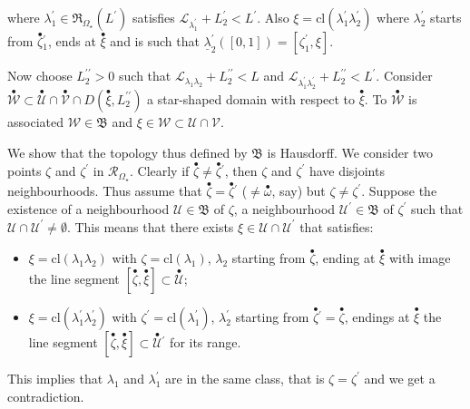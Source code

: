 \documentclass[11pt, english]{smfart}
\theoremstyle{definition}
\begin{document}
\begin{itemize}
\begin{itemize}
where $\lambda_1^\prime \in \mathfrak{R}_{\Omega_\star}(L^\prime) $ satisfies 
$\mathcal{L}_{\lambda_1^\prime} + L_2^\prime < L^\prime$.  Also $\xi =
\mathrm{cl}(\lambda_1^\prime \lambda_2^\prime)$ where
 $\lambda_2^\prime$ starts from ${ {\stackrel{\bullet}{\zeta}} }{_1^\prime}$, ends at ${ {\stackrel{\bullet}{\xi}} }$
and is such that  $\underline{\lambda}_2^\prime([0,1]) = [\zeta_1^\prime,\xi]$.
\end{itemize}
Now choose $L_2^{\prime \prime}>0$ such that $\displaystyle
 \mathcal{L}_{\lambda_1 \lambda_2} +L_2^{\prime \prime} <L$  and $\displaystyle
 \mathcal{L}_{\lambda_1^\prime \lambda_2^\prime} +L_2^{\prime \prime}
 <L^\prime$. Consider 
$\stackrel{\bullet}{\mathscr{W}} \subset \stackrel{\bullet}{\mathscr{U}}
 \cap \stackrel{\bullet}{\mathscr{V}} \cap D({ {\stackrel{\bullet}{\xi}} },L_2^{\prime
   \prime})$  a star-shaped domain with 
 respect to ${ {\stackrel{\bullet}{\xi}} }$. To $\stackrel{\bullet}{\mathscr{W}}$ is
 associated  $\mathscr{W} \in \mathfrak{B}$  and
$\xi \in \mathscr{W}  \subset \mathscr{U} \cap \mathscr{V}$.
\end{itemize}
We show that the topology thus defined by $\mathfrak{B}$ is
Hausdorff.  We consider two points
$\zeta $ and $\zeta^\prime$ in
$\mathscr{R}_{\Omega_\star}$. Clearly if ${ {\stackrel{\bullet}{\zeta}} } \neq { {\stackrel{\bullet}{\zeta}} }{^\prime}$,
then $\zeta$ and $\zeta^\prime$ have disjoints neighbourhoods. Thus
assume that ${ {\stackrel{\bullet}{\zeta}} } = { {\stackrel{\bullet}{\zeta}} }{^\prime}$ ($\neq { {\stackrel{\bullet}{\omega}} }$,
say) but $\zeta \neq \zeta^\prime$. Suppose the existence of a neighbourhood  
$\mathscr{U} \in \mathfrak{B}$ of $\zeta$, a neighbourhood 
$\mathscr{U}^\prime \in \mathfrak{B}$  of
$\zeta^\prime$  such that  $\mathscr{U}  \cap \mathscr{U}^\prime \neq
\emptyset$. This means that
there exists $\xi \in \mathscr{U} \cap \mathscr{U}^\prime$ that satisfies:
\begin{itemize}
\item $\xi = \mathrm{cl}(\lambda_1 \lambda_2)$ with $\zeta= \mathrm{cl}(\lambda_1)$,
 $\lambda_2$ starting from ${ {\stackrel{\bullet}{\zeta}} }$, ending at ${ {\stackrel{\bullet}{\xi}} }$ with image 
  the line segment $[{ {\stackrel{\bullet}{\zeta}} },{ {\stackrel{\bullet}{\xi}} }] \subset \stackrel{\bullet}{\mathscr{U}}$;
\item $\xi = \mathrm{cl}(\lambda_1^\prime \lambda_2^\prime)$ with 
$\zeta^\prime= \mathrm{cl}(\lambda_1^\prime)$,
 $\lambda_2^\prime $ starting from ${ {\stackrel{\bullet}{\zeta}} }{^\prime} ={ {\stackrel{\bullet}{\zeta}} }$, endings at ${ {\stackrel{\bullet}{\xi}} }$
  the line segment $[{ {\stackrel{\bullet}{\zeta}} },{ {\stackrel{\bullet}{\xi}} }] \subset
  {\stackrel{\bullet}{\mathscr{U}}}{^\prime}$ for its range. 
\end{itemize}
This implies that $\lambda_1$ and $\lambda_1^\prime$ are in the same
class, that is $\zeta = \zeta^\prime$ and we get a contradiction.
\end{document}
